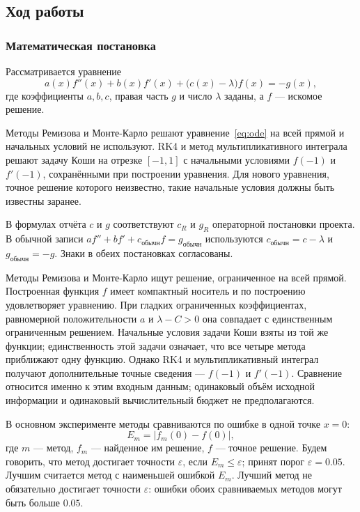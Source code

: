 \documentclass[14pt,a4paper]{extarticle}
\begin{document}
\subsection{Ход работы}
\subsubsection{Математическая постановка}
Рассматривается уравнение
\begin{equation}\label{eq:ode}
a(x)f''(x)+b(x)f'(x)+\bigl(c(x)-\lambda\bigr)f(x)=-g(x),
\end{equation}
где коэффициенты $a,b,c$, правая часть $g$ и число $\lambda$ заданы,
а $f$ --- искомое решение.

Методы Ремизова и Монте-Карло решают уравнение~\eqref{eq:ode} на всей
прямой и начальных условий не используют. RK4 и метод мультипликативного
интеграла решают задачу Коши на отрезке $[-1,1]$ с начальными условиями
$f(-1)$ и $f'(-1)$, сохранёнными при построении уравнения. Для нового
уравнения, точное решение которого неизвестно, такие начальные условия
должны быть известны заранее.

В формулах отчёта $c$ и $g$ соответствуют $c_R$ и $g_R$
операторной постановки проекта. В обычной записи
$af''+bf'+c_{\text{обычн}}f=g_{\text{обычн}}$ используются
$c_{\text{обычн}}=c-\lambda$ и $g_{\text{обычн}}=-g$.
Знаки в обеих постановках согласованы.

Методы Ремизова и Монте-Карло ищут решение, ограниченное на всей
прямой. Построенная функция $f$ имеет компактный носитель и по
построению удовлетворяет уравнению. При гладких ограниченных
коэффициентах, равномерной положительности $a$ и $\lambda-C>0$
она совпадает с единственным ограниченным решением. Начальные условия
задачи Коши взяты из той же функции; единственность этой задачи
означает, что все четыре метода приближают одну функцию.
Однако RK4 и мультипликативный интеграл получают дополнительные
точные сведения --- $f(-1)$ и $f'(-1)$. Сравнение относится именно
к этим входным данным; одинаковый объём исходной информации
и одинаковый вычислительный бюджет не предполагаются.

В основном эксперименте методы сравниваются по ошибке в одной точке $x=0$:
\begin{equation}\label{eq:ml-error}
E_m=\bigl|f_m(0)-f(0)\bigr|,
\end{equation}
где $m$ --- метод, $f_m$ --- найденное им решение, $f$ --- точное
решение. Будем говорить, что метод достигает точности $\varepsilon$,
если $E_m\le\varepsilon$; принят порог $\varepsilon=0.05$. Лучшим считается
метод с наименьшей ошибкой $E_m$. Лучший метод не обязательно достигает
точности $\varepsilon$: ошибки обоих сравниваемых методов могут быть
больше $0.05$.
\end{document}
